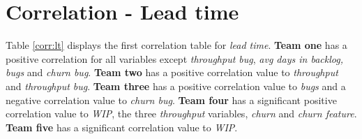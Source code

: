 \documentclass[UKenglish]{ifimaster}  %
\begin{document}
\section{Correlation - Lead time}
\label{sec:corr:lt}

Table \ref{corr:lt} displays the first correlation table for \textit{lead time}. \textbf{Team one} has a positive correlation for all variables except \textit{throughput bug}, \textit{avg days in backlog, bugs} and \textit{churn bug}. \textbf{Team two} has a positive correlation value to \textit{throughput} and \textit{throughput bug}. \textbf{Team three} has a positive correlation value to \textit{bugs} and a negative correlation value to \textit{churn bug}. \textbf{Team four} has a significant positive correlation value to \textit{WIP}, the three \textit{throughput} variables, \textit{churn} and \textit{churn feature}. \textbf{Team five} has a significant correlation value to \textit{WIP}.
\end{document}
